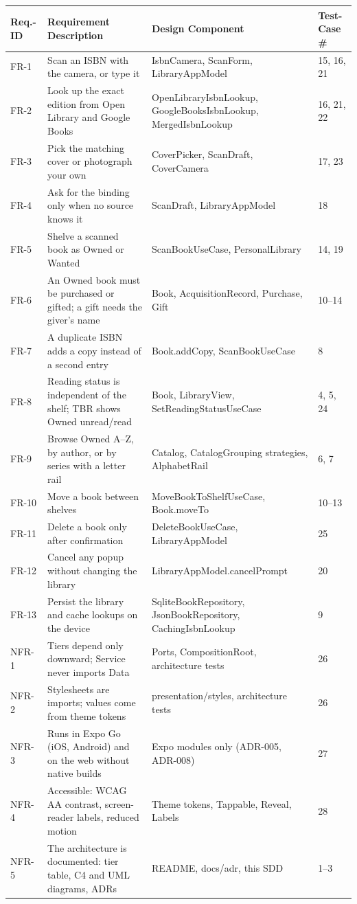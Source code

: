 \documentclass[12pt]{article}
\begin{document}
\begin{longtable}{|L{1.6cm}|L{5.2cm}|L{4.6cm}|L{2.6cm}|}
\hline
\textbf{Req.-ID} & \textbf{Requirement Description} & \textbf{Design Component} & \textbf{Test-Case \#} \\
\hline
\endhead
FR-1 & Scan an ISBN with the camera, or type it & IsbnCamera, ScanForm, LibraryAppModel & 15, 16, 21 \\ \hline
FR-2 & Look up the exact edition from Open Library and Google Books & OpenLibraryIsbnLookup, GoogleBooksIsbnLookup, MergedIsbnLookup & 16, 21, 22 \\ \hline
FR-3 & Pick the matching cover or photograph your own & CoverPicker, ScanDraft, CoverCamera & 17, 23 \\ \hline
FR-4 & Ask for the binding only when no source knows it & ScanDraft, LibraryAppModel & 18 \\ \hline
FR-5 & Shelve a scanned book as Owned or Wanted & ScanBookUseCase, PersonalLibrary & 14, 19 \\ \hline
FR-6 & An Owned book must be purchased or gifted; a gift needs the giver's name & Book, AcquisitionRecord, Purchase, Gift & 10--14 \\ \hline
FR-7 & A duplicate ISBN adds a copy instead of a second entry & Book.addCopy, ScanBookUseCase & 8 \\ \hline
FR-8 & Reading status is independent of the shelf; TBR shows Owned unread/read & Book, LibraryView, SetReadingStatusUseCase & 4, 5, 24 \\ \hline
FR-9 & Browse Owned A--Z, by author, or by series with a letter rail & Catalog, CatalogGrouping strategies, AlphabetRail & 6, 7 \\ \hline
FR-10 & Move a book between shelves & MoveBookToShelf\-UseCase, Book.moveTo & 10--13 \\ \hline
FR-11 & Delete a book only after confirmation & DeleteBookUseCase, LibraryAppModel & 25 \\ \hline
FR-12 & Cancel any popup without changing the library & LibraryAppModel\allowbreak.cancelPrompt & 20 \\ \hline
FR-13 & Persist the library and cache lookups on the device & SqliteBookRepository, JsonBookRepository, CachingIsbnLookup & 9 \\ \hline
NFR-1 & Tiers depend only downward; Service never imports Data & Ports, CompositionRoot, architecture tests & 26 \\ \hline
NFR-2 & Stylesheets are imports; values come from theme tokens & presentation/styles, architecture tests & 26 \\ \hline
NFR-3 & Runs in Expo Go (iOS, Android) and on the web without native builds & Expo modules only (ADR-005, ADR-008) & 27 \\ \hline
NFR-4 & Accessible: WCAG AA contrast, screen-reader labels, reduced motion & Theme tokens, Tappable, Reveal, Labels & 28 \\ \hline
NFR-5 & The architecture is documented: tier table, C4 and UML diagrams, ADRs & README, docs/adr, this SDD & 1--3 \\ \hline
\end{longtable}
\end{document}
